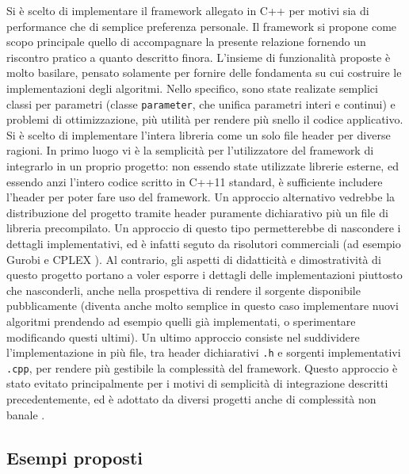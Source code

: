 \documentclass[12pt]{article}
\begin{document}
Si è scelto di implementare il framework allegato in C++ per motivi sia di performance che di semplice preferenza personale. Il framework si propone come scopo principale quello di accompagnare la presente relazione fornendo un riscontro pratico a quanto descritto finora. \newline 
L'insieme di funzionalità proposte è molto basilare, pensato solamente per fornire delle fondamenta su cui costruire le implementazioni degli algoritmi. Nello specifico, sono state realizate semplici classi per parametri (classe \texttt{parameter}, che unifica parametri interi e continui) e problemi di ottimizzazione, più utilità per rendere più snello il codice applicativo.\newline
\newline
Si è scelto di implementare l'intera libreria come un solo file header per diverse ragioni. In primo luogo vi è la semplicità per l'utilizzatore del framework di integrarlo in un proprio progetto: non essendo state utilizzate librerie esterne, ed essendo anzi l'intero codice scritto in C++11 standard, è sufficiente includere l'header per poter fare uso del framework. Un approccio alternativo vedrebbe la distribuzione del progetto tramite header puramente dichiarativo più un file di libreria precompilato. Un approccio di questo tipo permetterebbe di nascondere i dettagli implementativi, ed è infatti seguto da risolutori commerciali (ad esempio Gurobi \cite{Gurobi} e CPLEX \cite{Cplex}). Al contrario, gli aspetti  di didatticità e dimostratività di questo progetto portano a voler esporre i dettagli delle implementazioni piuttosto che nasconderli, anche nella prospettiva di rendere il sorgente disponibile pubblicamente (diventa anche molto semplice in questo caso implementare nuovi algoritmi prendendo ad esempio quelli già implementati, o sperimentare modificando questi ultimi). \newline
Un ultimo approccio consiste nel suddividere l'implementazione in più file, tra header dichiarativi \texttt{.h} e sorgenti implementativi \texttt{.cpp}, per rendere più gestibile la complessità del framework. Questo approccio è stato evitato principalmente per i motivi di semplicità di integrazione descritti precedentemente, ed è adottato da diversi progetti anche di complessità non banale \cite{JsonModern} \cite{stb}.\newline

\subsection*{Esempi proposti}
\end{document}
